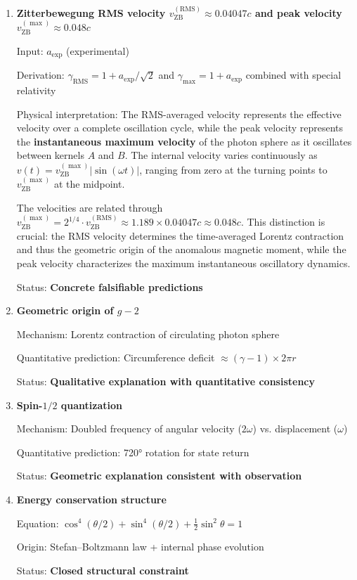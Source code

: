 \documentclass[12pt,letterpaper]{article}
\begin{document}
\begin{enumerate}
\item \textbf{Zitterbewegung RMS velocity $v_{\mathrm{ZB}}^{(\mathrm{RMS})} \approx 0.04047c$ and peak velocity $v_{\mathrm{ZB}}^{(\max)} \approx 0.048c$}

Input: $a_{\mathrm{exp}}$ (experimental)

Derivation: $\gamma_{\mathrm{RMS}} = 1 + a_{\mathrm{exp}}/\sqrt{2}$ and $\gamma_{\max} = 1 + a_{\mathrm{exp}}$ combined with special relativity

Physical interpretation: The RMS-averaged velocity represents the effective velocity over a complete oscillation cycle, while the peak velocity represents the \textbf{instantaneous maximum velocity} of the photon sphere as it oscillates between kernels $A$ and $B$. The internal velocity varies continuously as $v(t) = v_{\mathrm{ZB}}^{(\max)}|\sin(\omega t)|$, ranging from zero at the turning points to $v_{\mathrm{ZB}}^{(\max)}$ at the midpoint.

The velocities are related through $v_{\mathrm{ZB}}^{(\max)} = 2^{1/4} \cdot v_{\mathrm{ZB}}^{(\mathrm{RMS})} \approx 1.189 \times 0.04047c \approx 0.048c$. This distinction is crucial: the RMS velocity determines the time-averaged Lorentz contraction and thus the geometric origin of the anomalous magnetic moment, while the peak velocity characterizes the maximum instantaneous oscillatory dynamics.

Status: \textbf{Concrete falsifiable predictions}

\item \textbf{Geometric origin of $g - 2$}

Mechanism: Lorentz contraction of circulating photon sphere

Quantitative prediction: Circumference deficit $\approx (\gamma - 1) \times 2\pi r$

Status: \textbf{Qualitative explanation with quantitative consistency}

\item \textbf{Spin-$1/2$ quantization}

Mechanism: Doubled frequency of angular velocity ($2\omega$) vs. displacement ($\omega$)

Quantitative prediction: 720° rotation for state return

Status: \textbf{Geometric explanation consistent with observation}

\item \textbf{Energy conservation structure}

Equation: $\cos^4(\theta/2) + \sin^4(\theta/2) + \frac{1}{2}\sin^2\theta = 1$

Origin: Stefan--Boltzmann law + internal phase evolution

Status: \textbf{Closed structural constraint}

\end{enumerate}
\end{document}
